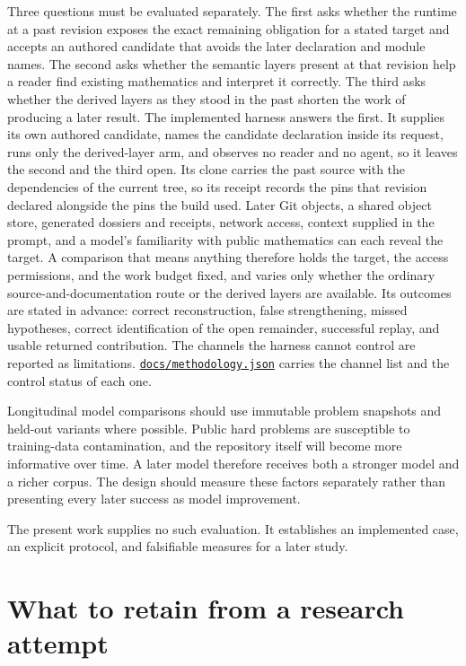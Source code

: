 \documentclass[10pt]{article}
\newcommand{\repobase}{https://github.com/wcook04/plectis-erdos}
\newcommand{\repolink}[2]{\href{\repobase/blob/ca0e13f8acf5ccf48506e4bdb870953d3a0856fa/#1}{\texttt{#2}}}
\begin{document}
Three questions must be evaluated separately.  The first asks whether the
runtime at a past revision exposes the exact remaining obligation for a stated
target and accepts an authored candidate that avoids the later declaration and
module names.  The second asks whether the semantic layers present at that
revision help a reader find existing mathematics and interpret it correctly.
The third asks whether the derived layers as they stood in the past shorten the
work of producing a later result.  The implemented harness answers the first.
It supplies its own authored candidate, names the candidate declaration inside
its request, runs only the derived-layer arm, and observes no reader and no
agent, so it leaves the second and the third open.  Its clone carries the past
source with the dependencies of the current tree, so its receipt records the
pins that revision declared alongside the pins the build used.  Later
Git objects, a shared object store, generated dossiers and receipts, network
access, context supplied in the prompt, and a model's familiarity with public
mathematics can each reveal the target.  A comparison that means anything
therefore holds the target, the access permissions, and the work budget fixed,
and varies only whether the ordinary source-and-documentation route or the
derived layers are available.  Its outcomes are stated in advance: correct
reconstruction, false strengthening, missed hypotheses, correct identification
of the open remainder, successful replay, and usable returned contribution.
The channels the harness cannot control are reported as limitations.
\repolink{docs/methodology.json}{docs/methodology.json} carries the channel
list and the control status of each one.

Longitudinal model comparisons should use immutable problem snapshots and
held-out variants where possible.  Public hard problems are susceptible to
training-data contamination, and the repository itself will become more
informative over time.  A later model therefore receives both a stronger
model and a richer corpus.  The design should measure these factors
separately rather than presenting every later success as model improvement.

The present work supplies no such evaluation.  It establishes an implemented
case, an explicit protocol, and falsifiable measures for a later study.

\section{What to retain from a research attempt}\label{sec:learning}
\end{document}
